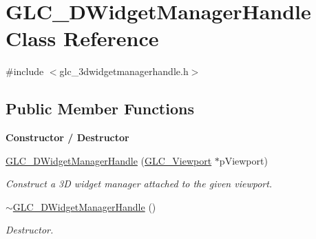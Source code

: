 \hypertarget{class_g_l_c__3_d_widget_manager_handle}{\section{G\-L\-C\-\_\-D\-Widget\-Manager\-Handle Class Reference}
\label{class_g_l_c__3_d_widget_manager_handle}
}


{\ttfamily \#include $<$glc\-\_\-3dwidgetmanagerhandle.\-h$>$}

\subsection*{Public Member Functions}
\begin{Indent}{\bf Constructor / Destructor}\par
\begin{DoxyCompactItemize}
\item 
\hyperlink{class_g_l_c__3_d_widget_manager_handle_ac4d29b191d7339c91ed0774c851447e7}{G\-L\-C\-\_\-D\-Widget\-Manager\-Handle} (\hyperlink{class_g_l_c___viewport}{G\-L\-C\-\_\-\-Viewport} $\ast$p\-Viewport)
\begin{DoxyCompactList}\small\item\em Construct a 3\-D widget manager attached to the given viewport. \end{DoxyCompactList}\item 
\hyperlink{class_g_l_c__3_d_widget_manager_handle_ab77edd658cbab7cbcd9ae248b3bf9c1a}{$\sim$\-G\-L\-C\-\_\-D\-Widget\-Manager\-Handle} ()
\begin{DoxyCompactList}\small\item\em Destructor. \end{DoxyCompactList}\end{DoxyCompactItemize}
\end{Indent}
